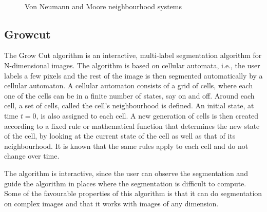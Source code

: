 \documentclass[a4paper,10pt]{article}
\begin{document}
\begin{figure}[H]
\centering
\mbox{ \quad
{}} \caption{Von Neumann and
Moore neighbourhood systems \cite{n}}
\end{figure}

\subsection{Growcut}
The Grow Cut algorithm is an interactive, multi-label segmentation algorithm for N-dimensional images.  The algorithm is based on cellular automata, i.e.,  the user labels a few pixels
and the rest of the image is then segmented automatically by a cellular automaton.  A cellular automaton consists of a grid of cells, where each one of the cells can be in 
a finite number of states, say on and off.   Around each cell, a set of cells, called the cell's neighbourhood is defined.  An initial state, at time $t = 0$, is also assigned to each cell.
A new generation of cells is then created according to a fixed rule or mathematical function that determines the new state of the cell, by looking at the current state of the cell as well
as that of its neighbourhood.  It is known that the same rules apply to each cell and do not change over time.

The algorithm is interactive, since the user can observe the segmentation and guide the algorithm in places where the segmentation is difficult to compute.
Some of the favourable properties of this algorithm is that it can do segmentation on complex images and that it works with images of any dimension. \\
\end{document}
